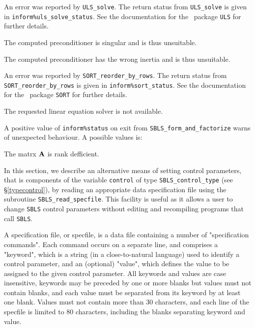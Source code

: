 \documentclass{galahad}
\newcommand{\packagename}{SBLS}
\begin{document}
\begin{description}
 An error was reported by {\tt ULS\_solve}. The return
status from {\tt ULS\_solve} is given in {\tt inform\%uls\_solve\_status}.
See the documentation for the \galahad\ package {\tt ULS} for further details.

 The computed preconditioner is singular
and is thus unsuitable.

 The computed preconditioner has the wrong
inertia and is thus unsuitable.

 An error was reported by {\tt SORT\_reorder\_by\_rows}.
The return status from {\tt SORT\_reorder\_by\_rows}
is given in {\tt inform\%sort\_status}.
See the documentation for the \galahad\ package {\tt SORT} for further details.

 The requested linear equation solver is not available.

\end{description}

A positive value of {\tt inform\%status} on exit from
{\tt \packagename\_form\_and\_factorize} warns of unexpected behaviour.
A possible values is:

\begin{description}

 The matrx ${\mathbf{A}}$ is rank defficient.

\end{description}


\galfeatures
\noindent In this section, we describe an alternative means of setting
control parameters, that is components of the variable {\tt control} of type
{\tt \packagename\_control\_type}
(see \S\ref{typecontrol}),
by reading an appropriate data specification file using the
subroutine {\tt \packagename\_read\_specfile}. This facility
is useful as it allows a user to change  {\tt \packagename} control parameters
without editing and recompiling programs that call {\tt \packagename}.

A specification file, or specfile, is a data file containing a number of
"specification commands". Each command occurs on a separate line,
and comprises a "keyword",
which is a string (in a close-to-natural language) used to identify a
control parameter, and
an (optional) "value", which defines the value to be assigned to the given
control parameter. All keywords and values are case insensitive,
keywords may be preceded by one or more blanks but
values must not contain blanks, and
each value must be separated from its keyword by at least one blank.
Values must not contain more than 30 characters, and
each line of the specfile is limited to 80 characters,
including the blanks separating keyword and value.
\end{document}
